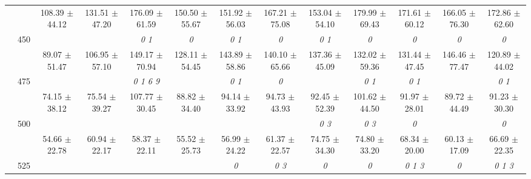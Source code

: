 \begin{table}[h]
{\begin{tabular}{
        ccccccccccccc}
 & & \cellcolor[HTML]{EFEFEF} 108.39 $\pm$ 44.12& \cellcolor[HTML]{EFEFEF} 131.51 $\pm$ 47.20& \cellcolor[HTML]{EFEFEF} 176.09 $\pm$ 61.59& \cellcolor[HTML]{EFEFEF} 150.50 $\pm$ 55.67& \cellcolor[HTML]{EFEFEF} 151.92 $\pm$ 56.03& \cellcolor[HTML]{EFEFEF} 167.21 $\pm$ 75.08& \cellcolor[HTML]{EFEFEF} 153.04 $\pm$ 54.10& \cellcolor[HTML]{EFEFEF} 179.99 $\pm$ 69.43& \cellcolor[HTML]{EFEFEF} 171.61 $\pm$ 60.12& \cellcolor[HTML]{EFEFEF} 166.05 $\pm$ 76.30& \cellcolor[HTML]{EFEFEF} 172.86 $\pm$ 62.60 \\ 
 & \multirow{2}{*}{450}& & & \textit{ 0 1 }& \textit{ 0 }& \textit{ 0 1 }& \textit{ 0 }& \textit{ 0 1 }& \textit{ 0 }& \textit{ 0 }& \textit{ 0 }& \textit{ 0 } \\ 
 & & 89.07 $\pm$ 51.47& 106.95 $\pm$ 57.10& 149.17 $\pm$ 70.94& 128.11 $\pm$ 54.45& 143.89 $\pm$ 58.86& 140.10 $\pm$ 65.66& 137.36 $\pm$ 45.09& 132.02 $\pm$ 59.36& 131.44 $\pm$ 47.45& 146.46 $\pm$ 77.47& 120.89 $\pm$ 44.02 \\ 
 & \multirow{2}{*}{475}& \cellcolor[HTML]{EFEFEF} & \cellcolor[HTML]{EFEFEF} & \cellcolor[HTML]{EFEFEF} \textit{ 0 1 6 9 }& \cellcolor[HTML]{EFEFEF} & \cellcolor[HTML]{EFEFEF} \textit{ 0 1 }& \cellcolor[HTML]{EFEFEF} \textit{ 0 }& \cellcolor[HTML]{EFEFEF} & \cellcolor[HTML]{EFEFEF} \textit{ 0 1 }& \cellcolor[HTML]{EFEFEF} \textit{ 0 1 }& \cellcolor[HTML]{EFEFEF} & \cellcolor[HTML]{EFEFEF} \textit{ 0 1 } \\ 
 & & \cellcolor[HTML]{EFEFEF} 74.15 $\pm$ 38.12& \cellcolor[HTML]{EFEFEF} 75.54 $\pm$ 39.27& \cellcolor[HTML]{EFEFEF} 107.77 $\pm$ 30.45& \cellcolor[HTML]{EFEFEF} 88.82 $\pm$ 34.40& \cellcolor[HTML]{EFEFEF} 94.14 $\pm$ 33.92& \cellcolor[HTML]{EFEFEF} 94.73 $\pm$ 43.93& \cellcolor[HTML]{EFEFEF} 92.45 $\pm$ 52.39& \cellcolor[HTML]{EFEFEF} 101.62 $\pm$ 44.50& \cellcolor[HTML]{EFEFEF} 91.97 $\pm$ 28.01& \cellcolor[HTML]{EFEFEF} 89.72 $\pm$ 44.49& \cellcolor[HTML]{EFEFEF} 91.23 $\pm$ 30.30 \\ 
 & \multirow{2}{*}{500}& & & & & & & \textit{ 0 3 }& \textit{ 0 3 }& \textit{ 0 }& & \textit{ 0 } \\ 
 & & 54.66 $\pm$ 22.78& 60.94 $\pm$ 22.17& 58.37 $\pm$ 22.11& 55.52 $\pm$ 25.73& 56.99 $\pm$ 24.22& 61.37 $\pm$ 22.57& 74.75 $\pm$ 34.30& 74.80 $\pm$ 33.20& 68.34 $\pm$ 20.00& 60.13 $\pm$ 17.09& 66.69 $\pm$ 22.35 \\ 
 & \multirow{2}{*}{525}& \cellcolor[HTML]{EFEFEF} & \cellcolor[HTML]{EFEFEF} & \cellcolor[HTML]{EFEFEF} & \cellcolor[HTML]{EFEFEF} & \cellcolor[HTML]{EFEFEF} \textit{ 0 }& \cellcolor[HTML]{EFEFEF} \textit{ 0 3 }& \cellcolor[HTML]{EFEFEF} \textit{ 0 }& \cellcolor[HTML]{EFEFEF} \textit{ 0 }& \cellcolor[HTML]{EFEFEF} \textit{ 0 1 3 }& \cellcolor[HTML]{EFEFEF} \textit{ 0 }& \cellcolor[HTML]{EFEFEF} \textit{ 0 1 3 } \\ 

\end{tabular}}
\end{table}
